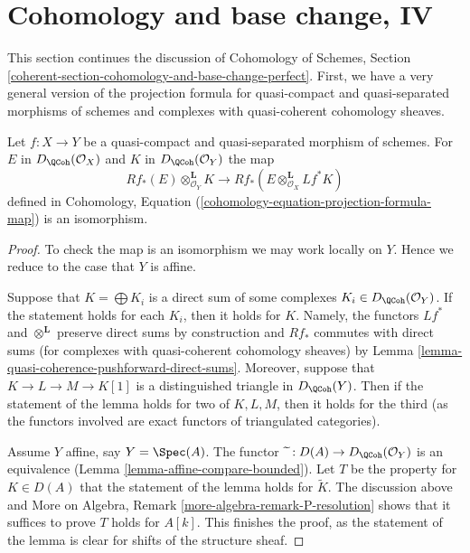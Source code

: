 \section{Cohomology and base change, IV}
\label{section-cohomology-and-base-change-perfect}

\noindent
This section continues the discussion of
Cohomology of Schemes, Section
\ref{coherent-section-cohomology-and-base-change-perfect}.
First, we have a very general version of the projection
formula for quasi-compact and quasi-separated morphisms of schemes 
and complexes with quasi-coherent cohomology sheaves.

\begin{lemma}
\label{lemma-cohomology-base-change}
Let $f : X \to Y$ be a quasi-compact and quasi-separated morphism
of schemes. For $E$ in $D_\QCoh(\mathcal{O}_X)$ and
$K$ in $D_\QCoh(\mathcal{O}_Y)$ the map
$$
Rf_*(E) \otimes_{\mathcal{O}_Y}^\mathbf{L} K
\longrightarrow
Rf_*(E \otimes_{\mathcal{O}_X}^\mathbf{L} Lf^*K)
$$
defined in
Cohomology, Equation (\ref{cohomology-equation-projection-formula-map})
is an isomorphism.
\end{lemma}

\begin{proof}
To check the map is an isomorphism we may work locally on $Y$.
Hence we reduce to the case that $Y$ is affine.

\medskip\noindent
Suppose that $K = \bigoplus K_i$ is a direct
sum of some complexes $K_i \in D_\QCoh(\mathcal{O}_Y)$.
If the statement holds for each $K_i$, then it holds for $K$.
Namely, the functors $Lf^*$ and $\otimes^\mathbf{L}$ preserve
direct sums by construction and $Rf_*$ commutes with direct sums
(for complexes with quasi-coherent cohomology sheaves) by
Lemma \ref{lemma-quasi-coherence-pushforward-direct-sums}.
Moreover, suppose that $K \to L \to M \to K[1]$ is a distinguished
triangle in $D_\QCoh(Y)$. Then if the statement of the
lemma holds for two of $K, L, M$, then it holds for the third
(as the functors involved are exact functors of triangulated categories).

\medskip\noindent
Assume $Y$ affine, say $Y = \Spec(A)$. The functor
$\widetilde{\ } : D(A) \to D_\QCoh(\mathcal{O}_Y)$ is an equivalence
(Lemma \ref{lemma-affine-compare-bounded}).
Let $T$ be the property for $K \in D(A)$ that
the statement of the lemma holds for $\widetilde{K}$.
The discussion above and
More on Algebra, Remark \ref{more-algebra-remark-P-resolution}
shows that it suffices to prove $T$ holds for $A[k]$.
This finishes the proof, as the statement of the lemma
is clear for shifts of the structure sheaf.
\end{proof}

